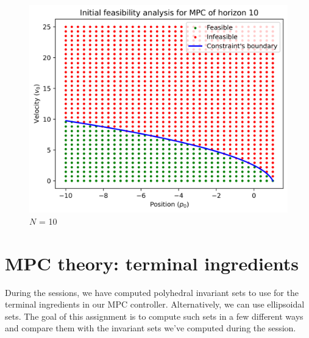 \documentclass[]{article}
\begin{document}
\begin{figure}[H]
    \centering
    \begin{minipage}{0.7\textwidth}
        \centering
        \includegraphics[width=\textwidth]{images/Assignment_24_N10.png}
        \caption{$N$ = 10}
        \label{fig:assignment2_4_3}
    \end{minipage}
\end{figure}



\newpage
\section{MPC theory: terminal ingredients}
During the sessions, we have computed polyhedral invariant sets to use 
for the terminal ingredients in our MPC controller. 
Alternatively, we can use ellipsoidal sets. 
The goal of this assignment is to compute such sets in a few different ways 
and compare them with the invariant sets we've computed during 
the session.
\end{document}
